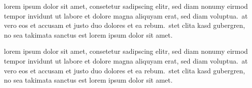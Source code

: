 \documentclass{article}
\date{September 14, 2013}
\begin{document}
\maketitle

\begin{multicols}{3}{

    lorem ipsum dolor sit amet, consetetur sadipscing elitr, sed diam nonumy eirmod
    tempor invidunt ut labore et dolore magna aliquyam erat, sed diam voluptua.\ at
    vero eos et accusam et justo duo dolores et ea rebum.\ stet clita kasd gubergren,
    no sea takimata sanctus est lorem ipsum dolor sit amet.\
    \closearticle

    
    \closearticle

    
    \closearticle


    lorem ipsum dolor sit amet, consetetur sadipscing elitr, sed diam nonumy eirmod
    tempor invidunt ut labore et dolore magna aliquyam erat, sed diam voluptua.\ at
    vero eos et accusam et justo duo dolores et ea rebum.\ stet clita kasd gubergren,
    no sea takimata sanctus est lorem ipsum dolor sit amet.\

}
\end{multicols}

\begin{multicols}{2}{
    
    
    }
\end{multicols}
\end{document}
